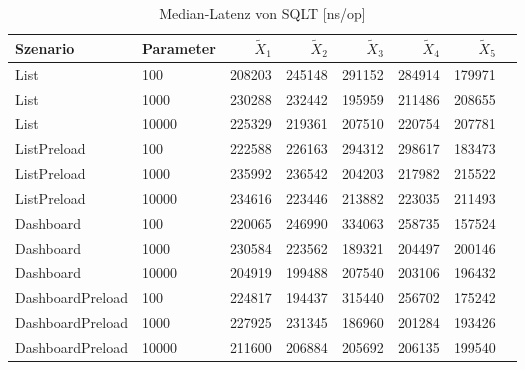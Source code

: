 
\begin{table}[ht]
\setlength{\extrarowheight}{-1pt}
\centering
\caption{Median-Latenz von SQLT [ns/op]}
\begin{tabular}{llrrrrrr}
\toprule
Szenario & Parameter & ${\tilde{X}_1}$ & ${\tilde{X}_2}$ & ${\tilde{X}_3}$ & ${\tilde{X}_4}$ & ${\tilde{X}_5}$ \\
\midrule
	List & 100 & 208203 & 245148 & 291152 & 284914 & 179971 \\
	List & 1000 & 230288 & 232442 & 195959 & 211486 & 208655 \\
	List & 10000 & 225329 & 219361 & 207510 & 220754 & 207781 \\
	ListPreload & 100 & 222588 & 226163 & 294312 & 298617 & 183473 \\
	ListPreload & 1000 & 235992 & 236542 & 204203 & 217982 & 215522 \\
	ListPreload & 10000 & 234616 & 223446 & 213882 & 223035 & 211493 \\
	Dashboard & 100 & 220065 & 246990 & 334063 & 258735 & 157524 \\
	Dashboard & 1000 & 230584 & 223562 & 189321 & 204497 & 200146 \\
	Dashboard & 10000 & 204919 & 199488 & 207540 & 203106 & 196432 \\
	DashboardPreload & 100 & 224817 & 194437 & 315440 & 256702 & 175242 \\
	DashboardPreload & 1000 & 227925 & 231345 & 186960 & 201284 & 193426 \\
	DashboardPreload & 10000 & 211600 & 206884 & 205692 & 206135 & 199540 \\
\bottomrule
\end{tabular}
\label{tab:durchsatz_sqlt}
\end{table}
	